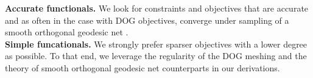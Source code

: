 \textbf{Accurate functionals.} We look for constraints and objectives that are accurate and as often in the case with DOG objectives, converge under sampling of a smooth orthogonal geodesic net \cite{rabi18,rabi2018shape}. \\
\textbf{Simple funcationals.} We strongly prefer sparser objectives with a lower degree as possible. To that end, we leverage the regularity of the DOG meshing and the theory of smooth orthogonal geodesic net counterparts in our derivations. \\

